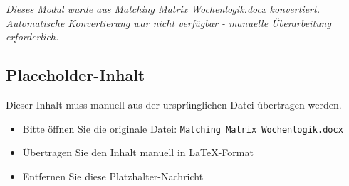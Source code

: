 \begin{center}
\textit{Dieses Modul wurde aus Matching Matrix Wochenlogik.docx konvertiert.\\
Automatische Konvertierung war nicht verfügbar - manuelle Überarbeitung erforderlich.}
\end{center}


\subsection{Placeholder-Inhalt}

Dieser Inhalt muss manuell aus der ursprünglichen Datei übertragen werden.

\begin{itemize}
\item Bitte öffnen Sie die originale Datei: \texttt{Matching Matrix Wochenlogik.docx}
\item Übertragen Sie den Inhalt manuell in LaTeX-Format
\item Entfernen Sie diese Platzhalter-Nachricht
\end{itemize}


